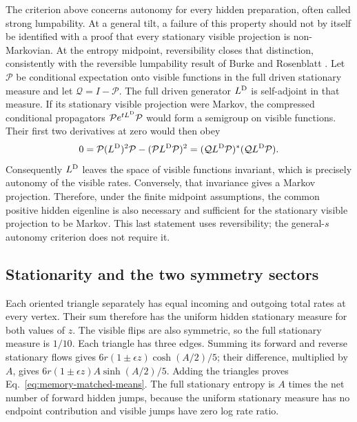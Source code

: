 \documentclass[aps,pre,reprint,amsmath,amssymb,longbibliography,floatfix]{revtex4-2}
\begin{document}
The criterion above concerns autonomy for every hidden preparation,
often called strong lumpability. At a general tilt, a failure of this
property should not by itself be identified with a proof that every
stationary visible projection is non-Markovian. At the entropy
midpoint, reversibility closes that distinction, consistently with
the reversible lumpability result of Burke and Rosenblatt
\cite{BurkeRosenblatt1958}. Let $\mathcal P$ be
conditional expectation onto visible functions in the full driven
stationary measure and let $\mathcal Q=I-\mathcal P$. The full driven
generator $L^{\rm D}$ is self-adjoint in that measure. If its
stationary visible projection were Markov, the compressed conditional
propagators $\mathcal P e^{tL^{\rm D}}\mathcal P$ would form a
semigroup on visible functions. Their first two derivatives at zero
would then obey
\begin{equation}
 0=\mathcal P(L^{\rm D})^2\mathcal P
       -(\mathcal P L^{\rm D}\mathcal P)^2
   =(\mathcal Q L^{\rm D}\mathcal P)^*
     (\mathcal Q L^{\rm D}\mathcal P).
 \label{eq:common-line-reversible-compression}
\end{equation}
Consequently $L^{\rm D}$ leaves the space of visible functions
invariant, which is precisely autonomy of the visible rates.
Conversely, that invariance gives a Markov projection. Therefore,
under the finite midpoint assumptions, the common positive hidden
eigenline is also necessary and sufficient for the stationary visible
projection to be Markov. This last statement uses reversibility;
the general-$s$ autonomy criterion does not require it.

\subsection{Stationarity and the two symmetry sectors}

Each oriented triangle separately has equal incoming and outgoing
total rates at every vertex. Their sum therefore has the uniform
hidden stationary measure for both values of $z$. The visible flips
are also symmetric, so the full stationary measure is $1/10$.
Each triangle has three edges. Summing its forward and reverse
stationary flows gives $6r(1\pm\epsilon z)\cosh(A/2)/5$;
their difference, multiplied by $A$, gives
$6r(1\pm\epsilon z)A\sinh(A/2)/5$. Adding the triangles proves
Eq.~\eqref{eq:memory-matched-means}. The full stationary entropy is
$A$ times the net number of forward hidden jumps, because the uniform
stationary measure has no endpoint contribution and visible jumps have
zero log rate ratio.
\end{document}
